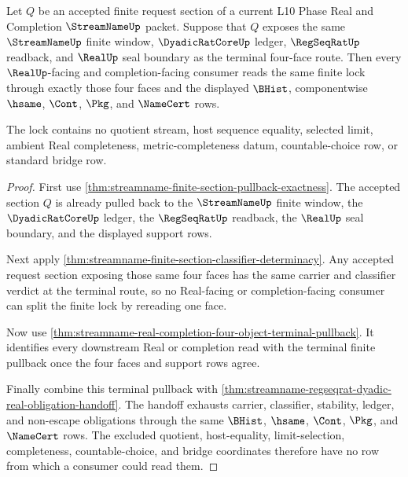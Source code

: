 \begin{theorem}
\label{thm:streamname-finite-section-real-regseq-dyadic-lock}
Let $Q$ be an accepted finite request section of a current L10 Phase Real and
Completion $\StreamNameUp$ packet. Suppose that $Q$ exposes the same
$\StreamNameUp$ finite window, $\DyadicRatCoreUp$ ledger, $\RegSeqRatUp$
readback, and $\RealUp$ seal boundary as the terminal four-face route. Then
every $\RealUp$-facing and completion-facing consumer reads the same finite
lock through exactly those four faces and the displayed $\BHist$,
componentwise $\hsame$, $\Cont$, $\Pkg$, and $\NameCert$ rows.

The lock contains no quotient stream, host sequence equality, selected limit,
ambient Real completeness, metric-completeness datum, countable-choice row, or
standard bridge row.
\end{theorem}
\begin{proof}
First use \autoref{thm:streamname-finite-section-pullback-exactness}. The
accepted section $Q$ is already pulled back to the $\StreamNameUp$ finite
window, the $\DyadicRatCoreUp$ ledger, the $\RegSeqRatUp$ readback, the
$\RealUp$ seal boundary, and the displayed support rows.

Next apply \autoref{thm:streamname-finite-section-classifier-determinacy}.
Any accepted request section exposing those same four faces has the same
carrier and classifier verdict at the terminal route, so no Real-facing or
completion-facing consumer can split the finite lock by rereading one face.

Now use \autoref{thm:streamname-real-completion-four-object-terminal-pullback}.
It identifies every downstream Real or completion read with the terminal
finite pullback once the four faces and support rows agree.

Finally combine this terminal pullback with
\autoref{thm:streamname-regseqrat-dyadic-real-obligation-handoff}. The handoff
exhausts carrier, classifier, stability, ledger, and non-escape obligations
through the same $\BHist$, $\hsame$, $\Cont$, $\Pkg$, and $\NameCert$ rows.
The excluded quotient, host-equality, limit-selection, completeness,
countable-choice, and bridge coordinates therefore have no row from which a
consumer could read them.
\end{proof}

